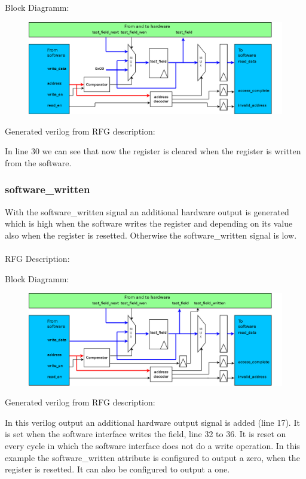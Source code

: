 \documentclass[12pt,a4paper]{article}
\begin{document}
Block Diagramm:
\begin{figure}[h!]
    \includegraphics[width=\textwidth]{pictures/Reg_hrw_srw_swrite_clear.png}
\end{figure}
\newpage
Generated verilog from RFG description:

In line 30 we can see that now the register is cleared when the register is written from the software.
\newpage

\subsubsection{software\_written}
With the software\_written signal an additional hardware output is generated which is high when the software writes the register and depending on its value also when the register is resetted. Otherwise the software\_written signal is low.\\
\\
RFG Description:


Block Diagramm:
\begin{figure}[h!]
    \includegraphics[width=\textwidth]{pictures/Reg_hrw_srw_swritten.png}
\end{figure}
\newpage
Generated verilog from RFG description:

In this verilog output an additional hardware output signal is added (line 17). It is set when the software interface writes the field, line 32 to 36. It is reset on every cycle in which the software interface does not do a write operation. In this example the software\_written attribute is configured to output a zero, when the register is resetted. It can also be configured to output a one.
\newpage
\end{document}
